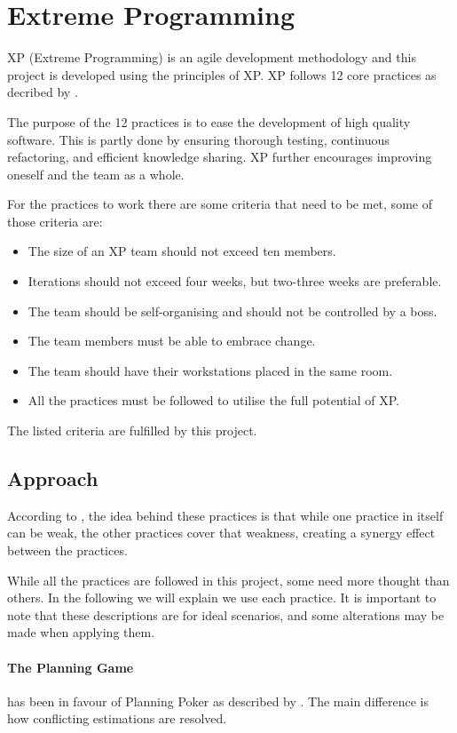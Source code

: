 \section{Extreme Programming}
XP (Extreme Programming) is an agile development methodology and this project is developed using the principles of XP. XP follows 12 core practices as decribed by \citet[p. 54]{xp:explained}.

The purpose of the 12 practices is to ease the development of high quality software. This is partly done by ensuring thorough testing, continuous refactoring, and efficient knowledge sharing. XP further encourages improving oneself and the team as a whole.

For the practices to work there are some criteria that need to be met, some of those criteria are:
\begin{itemize}
\item The size of an XP team should not exceed ten members.
\item Iterations should not exceed four weeks, but two-three weeks are preferable.
\item The team should be self-organising and should not be controlled by a boss.
\item The team members must be able to embrace change.
\item The team should have their workstations placed in the same room.
\item All the practices must be followed to utilise the full potential of XP.
\end{itemize}

The listed criteria are fulfilled by this project.

\subsection{Approach}
According to \citet[p. 53]{xp:explained}, the idea behind these practices is that while one practice in itself can be weak, the other practices cover that weakness, creating a synergy effect between the practices.

While all the practices are followed in this project, some need more thought than others. In the following we will explain we use each practice. It is important to note that these descriptions are for ideal scenarios, and some alterations may be made when applying them.

\paragraph{The Planning Game} has been in favour of Planning Poker as described by \citet{xp:planningPoker}.
The main difference is how conflicting estimations are resolved. 


